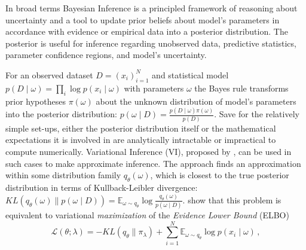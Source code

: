 \documentclass[a4paper,10pt,twocolumn]{article}
\begin{document}
In broad terms Bayesian Inference is a principled framework of reasoning about uncertainty
and a tool to update prior beliefs about model's parameters in accordance with evidence
or empirical data into a posterior distribution. The posterior is useful for inference
regarding unobserved data, predictive statistics, parameter confidence regions, and
model's uncertainty.

For an observed dataset $
  D = (x_i)_{i=1}^N
$ and statistical model $
  p(D \mid \omega)
    = \prod_i \log p(x_i \mid \omega)
$ with parameters $\omega$ the Bayes rule transforms prior hypotheses $\pi(\omega)$
about the unknown distribution of model's parameters into the posterior distribution: $
  p(\omega \mid D) = \tfrac{p(D \mid \omega) \pi(\omega)}{p(D)}
$.
%
Save for the relatively simple set-ups, either the posterior distribution itself or the
mathematical expectations it is involved in are analytically intractable or impractical
to compute numerically. Variational Inference (VI), proposed by \citet{jordan_introduction_1999},
can be used in such cases to make approximate inference. The approach finds an approximation
within some distribution family $q_\theta(\omega)$, which is closest to the true posterior
distribution in terms of Kullback-Leibler divergence: $
  KL(q_\theta(\omega) \| p(\omega \mid D))
    = \mathbb{E}_{\omega \sim q_\theta}
      \log \tfrac{q_\theta(\omega)}{p(\omega \mid D)}
$. %
%
\citet{jordan_introduction_1999} show that this problem is equivalent to variational
\emph{maximization} of the \emph{Evidence Lower Bound} (ELBO)
\begin{equation}  \label{eq:elbo_general}
  \mathcal{L}(\theta; \lambda)
    = - KL(q_{\theta} \| \pi_{\lambda})
      + \sum_{i=1}^N \mathbb{E}_{\omega \sim q_{\theta}}
        \log p(x_i \mid \omega)
  \,,
\end{equation}
\end{document}
